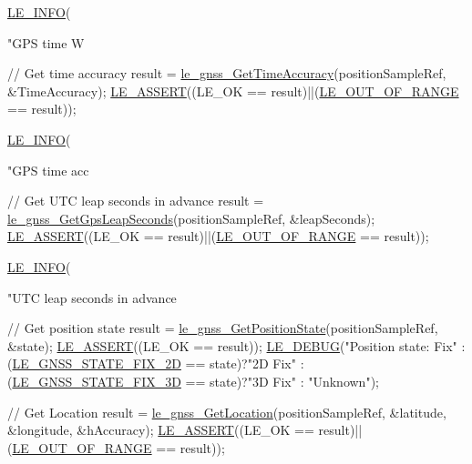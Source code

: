 \begin{DoxyCodeInclude}
{{{{{{{    \hyperlink{le__log_8h_a23e6d206faa64f612045d688cdde5808}{LE\_INFO}(\textcolor{stringliteral}{"GPS time W %

    \textcolor{comment}{// Get time accuracy}
    result = \hyperlink{le__gnss__interface_8h_ad41698ff4a68651b9fb81b862d4274f6}{le\_gnss\_GetTimeAccuracy}(positionSampleRef, &TimeAccuracy);
    \hyperlink{le__log_8h_ac0dbbef91dc0fed449d0092ff0557b39}{LE\_ASSERT}((LE\_OK == result)||(\hyperlink{le__basics_8h_a1cca095ed6ebab24b57a636382a6c86caef8ecf11fa8556fd2d3ca8faab697717}{LE\_OUT\_OF\_RANGE} == result));

    \hyperlink{le__log_8h_a23e6d206faa64f612045d688cdde5808}{LE\_INFO}(\textcolor{stringliteral}{"GPS time acc %

    \textcolor{comment}{// Get UTC leap seconds in advance}
    result = \hyperlink{le__gnss__interface_8h_a9e2b23f2420e53ca86f48a0f0c43f2d0}{le\_gnss\_GetGpsLeapSeconds}(positionSampleRef, &leapSeconds);
    \hyperlink{le__log_8h_ac0dbbef91dc0fed449d0092ff0557b39}{LE\_ASSERT}((LE\_OK == result)||(\hyperlink{le__basics_8h_a1cca095ed6ebab24b57a636382a6c86caef8ecf11fa8556fd2d3ca8faab697717}{LE\_OUT\_OF\_RANGE} == result));

    \hyperlink{le__log_8h_a23e6d206faa64f612045d688cdde5808}{LE\_INFO}(\textcolor{stringliteral}{"UTC leap seconds in advance %

    \textcolor{comment}{// Get position state}
    result = \hyperlink{le__gnss__interface_8h_a0a0df2ffe42b6277f43af0e52e617339}{le\_gnss\_GetPositionState}(positionSampleRef, &state);
    \hyperlink{le__log_8h_ac0dbbef91dc0fed449d0092ff0557b39}{LE\_ASSERT}((LE\_OK == result));
    \hyperlink{le__log_8h_a2a91ea8857cf190fde71d85ba930a498}{LE\_DEBUG}(\textcolor{stringliteral}{"Position state: %
       Fix"}
                                 :(\hyperlink{le__gnss__interface_8h_abcb86aa054abc7a32d2f5a7363387ef1a1325f1c092b36936bb75b5087499b82b}{LE\_GNSS\_STATE\_FIX\_2D} == state)?\textcolor{stringliteral}{"2D Fix"}
                                 :(\hyperlink{le__gnss__interface_8h_abcb86aa054abc7a32d2f5a7363387ef1a6eef37535d6eb582771825a1e0ccbb90}{LE\_GNSS\_STATE\_FIX\_3D} == state)?\textcolor{stringliteral}{"3D Fix"}
                                 : \textcolor{stringliteral}{"Unknown"});

    \textcolor{comment}{// Get Location}
    result = \hyperlink{le__gnss__interface_8h_ada100f53f9ad9f3df852fcc6639c15bc}{le\_gnss\_GetLocation}(positionSampleRef, &latitude, &longitude, &hAccuracy);
    \hyperlink{le__log_8h_ac0dbbef91dc0fed449d0092ff0557b39}{LE\_ASSERT}((LE\_OK == result)||(\hyperlink{le__basics_8h_a1cca095ed6ebab24b57a636382a6c86caef8ecf11fa8556fd2d3ca8faab697717}{LE\_OUT\_OF\_RANGE} == result));

}}}}}}}}}}
\end{DoxyCodeInclude}
